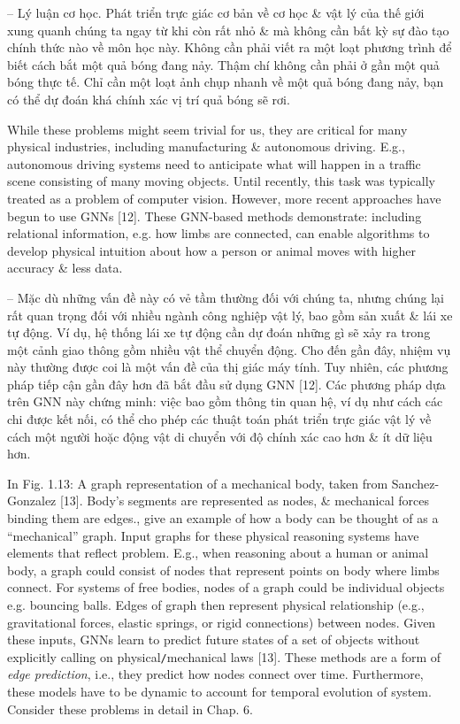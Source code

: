 \documentclass{article}
\begin{document}
\begin{itemize}
\begin{itemize}
\begin{itemize}
            -- {\sf Lý luận cơ học.} Phát triển trực giác cơ bản về cơ học \& vật lý của thế giới xung quanh chúng ta ngay từ khi còn rất nhỏ \& mà không cần bất kỳ sự đào tạo chính thức nào về môn học này. Không cần phải viết ra một loạt phương trình để biết cách bắt một quả bóng đang nảy. Thậm chí không cần phải ở gần một quả bóng thực tế. Chỉ cần một loạt ảnh chụp nhanh về một quả bóng đang nảy, bạn có thể dự đoán khá chính xác vị trí quả bóng sẽ rơi.

            While these problems might seem trivial for us, they are critical for many physical industries, including manufacturing \& autonomous driving. E.g., autonomous driving systems need to anticipate what will happen in a traffic scene consisting of many moving objects. Until recently, this task was typically treated as a problem of computer vision. However, more recent approaches have begun to use GNNs [12]. These GNN-based methods demonstrate: including relational information, e.g. how limbs are connected, can enable algorithms to develop physical intuition about how a person or animal moves with higher accuracy \& less data.

            -- Mặc dù những vấn đề này có vẻ tầm thường đối với chúng ta, nhưng chúng lại rất quan trọng đối với nhiều ngành công nghiệp vật lý, bao gồm sản xuất \& lái xe tự động. Ví dụ, hệ thống lái xe tự động cần dự đoán những gì sẽ xảy ra trong một cảnh giao thông gồm nhiều vật thể chuyển động. Cho đến gần đây, nhiệm vụ này thường được coi là một vấn đề của thị giác máy tính. Tuy nhiên, các phương pháp tiếp cận gần đây hơn đã bắt đầu sử dụng GNN [12]. Các phương pháp dựa trên GNN này chứng minh: việc bao gồm thông tin quan hệ, ví dụ như cách các chi được kết nối, có thể cho phép các thuật toán phát triển trực giác vật lý về cách một người hoặc động vật di chuyển với độ chính xác cao hơn \& ít dữ liệu hơn.

            In {\sf Fig. 1.13: A graph representation of a mechanical body, taken from Sanchez-Gonzalez [13]. Body's segments are represented as nodes, \& mechanical forces binding them are edges.}, give an example of how a body can be thought of as a ``mechanical'' graph. Input graphs for these physical reasoning systems have elements that reflect problem. E.g., when reasoning about a human or animal body, a graph could consist of nodes that represent points on body where limbs connect. For systems of free bodies, nodes of a graph could be individual objects e.g. bouncing balls. Edges of graph then represent physical relationship (e.g., gravitational forces, elastic springs, or rigid connections) between nodes. Given these inputs, GNNs learn to predict future states of a set of objects without explicitly calling on physical{\tt/}mechanical laws [13]. These methods are a form of {\it edge prediction}, i.e., they predict how nodes connect over time. Furthermore, these models have to be dynamic to account for temporal evolution of system. Consider these problems in detail in Chap. 6.


\end{itemize}
\end{itemize}
\end{itemize}
\end{document}
